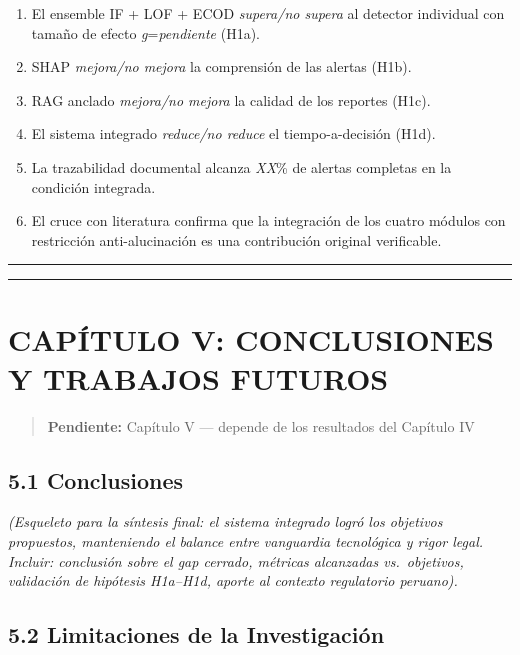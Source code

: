 \begin{enumerate}
\def\labelenumi{\arabic{enumi}.}
\tightlist
\item
  El ensemble IF + LOF + ECOD \emph{supera/no supera} al detector
  individual con tamaño de efecto \emph{g}=\emph{pendiente} (H1a).
\item
  SHAP \emph{mejora/no mejora} la comprensión de las alertas (H1b).
\item
  RAG anclado \emph{mejora/no mejora} la calidad de los reportes (H1c).
\item
  El sistema integrado \emph{reduce/no reduce} el tiempo-a-decisión
  (H1d).
\item
  La trazabilidad documental alcanza \emph{XX}\% de alertas completas en
  la condición integrada.
\item
  El cruce con literatura confirma que la integración de los cuatro
  módulos con restricción anti-alucinación es una contribución original
  verificable.
\end{enumerate}

\begin{center}\rule{0.5\linewidth}{0.5pt}\end{center}

\begin{center}\rule{0.5\linewidth}{0.5pt}\end{center}

\section{CAPÍTULO V: CONCLUSIONES Y TRABAJOS
FUTUROS}\label{capuxedtulo-v-conclusiones-y-trabajos-futuros}

\begin{quote}
\textbf{Pendiente:} Capítulo V --- depende de los resultados del
Capítulo IV
\end{quote}

\subsection{5.1 Conclusiones}\label{conclusiones}

\emph{(Esqueleto para la síntesis final: el sistema integrado logró los
objetivos propuestos, manteniendo el balance entre vanguardia
tecnológica y rigor legal. Incluir: conclusión sobre el gap cerrado,
métricas alcanzadas vs.~objetivos, validación de hipótesis H1a--H1d,
aporte al contexto regulatorio peruano).}

\subsection{5.2 Limitaciones de la
Investigación}\label{limitaciones-de-la-investigaciuxf3n-1}

